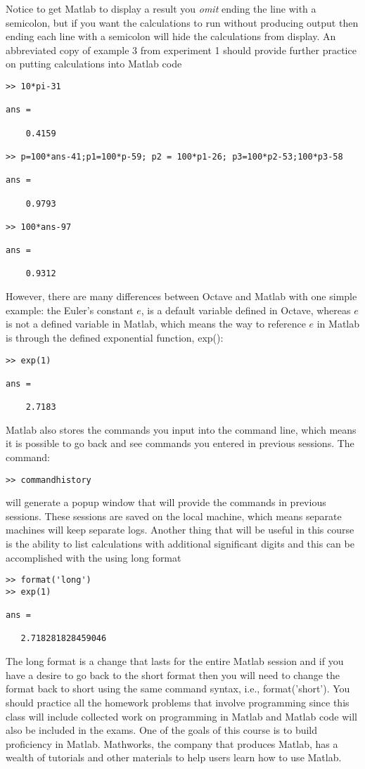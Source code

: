 \documentclass[twoside]{article}
\begin{document}
Notice to get Matlab to display a result you {\it omit} ending the line with a semicolon, but if you want the calculations to run without producing output then ending each line with a semicolon will hide the calculations from display.  An abbreviated copy of example 3 from experiment 1 should provide further practice on putting calculations into Matlab code
\begin{verbatim}
>> 10*pi-31

ans =

    0.4159

>> p=100*ans-41;p1=100*p-59; p2 = 100*p1-26; p3=100*p2-53;100*p3-58

ans =

    0.9793

>> 100*ans-97

ans =

    0.9312
\end{verbatim}
However, there are many differences between Octave and Matlab with one simple example: the Euler's constant $e$, is a default variable defined in Octave, whereas $e$ is not a defined variable in Matlab, which means the way to reference $e$ in Matlab is through the defined exponential function, exp():
\begin{verbatim}
>> exp(1)

ans =

    2.7183

\end{verbatim}
Matlab also stores the commands you input into the command line, which means it is possible to go back and see commands you entered in previous sessions. The command: 
\begin{verbatim}
>> commandhistory
\end{verbatim}
will generate a popup window that will provide the commands in previous sessions. These sessions are saved on the local machine, which means separate machines will keep separate logs. Another thing that will be useful in this course is the ability to list calculations with additional significant digits and this can be accomplished with the using long format
\begin{verbatim}
>> format('long')
>> exp(1)

ans =

   2.718281828459046
\end{verbatim}
The long format is a change that lasts for the entire Matlab session and if you have a desire to go back to the short format then you will need to change the format back to short using the same command syntax, i.e., format('short'). You should practice all the homework problems that involve programming since this class will include collected work on programming in Matlab and Matlab code will also be included in the exams. One of the goals of this course is to build proficiency in Matlab. Mathworks, the company that produces Matlab, has a wealth of tutorials and other materials to help users learn how to use Matlab. 
\end{document}
